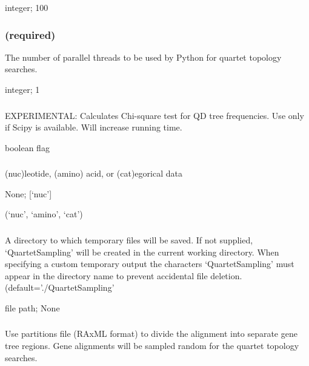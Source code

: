 \documentclass[letterpaper,12pt,english]{sphinxmanual}
\begin{document}
 integer;  100


\subsubsection{ (required)}
\label{\detokenize{prog_desc:t-number-of-threads-required}}
 The number of parallel threads to be used by Python for quartet topology searches.

 integer;  1


\subsubsection{}
\label{\detokenize{prog_desc:calc-qdstats}}
 EXPERIMENTAL: Calculates Chi-square test for QD tree frequencies. Use only  if Scipy is available. Will increase running time.

 boolean flag


\subsubsection{}
\label{\detokenize{prog_desc:d-data-type}}
 (nuc)leotide, (amino) acid, or (cat)egorical data

 None;  {[}‘nuc’{]}

 (‘nuc’, ‘amino’, ‘cat’)


\subsubsection{}
\label{\detokenize{prog_desc:e-temp-dir}}
 A directory to which temporary files will be saved. If not supplied, ‘QuartetSampling’ will be created in the current working directory. When specifying a custom temporary output the characters ‘QuartetSampling’ must appear in the directory name to prevent accidental file deletion. (default=’./QuartetSampling’

 file path;  None


\subsubsection{}
\label{\detokenize{prog_desc:g-genetrees}}
 Use partitions file (RAxML format) to divide the alignment into separate gene tree regions. Gene alignments will be sampled random for the quartet topology searches.
\end{document}
